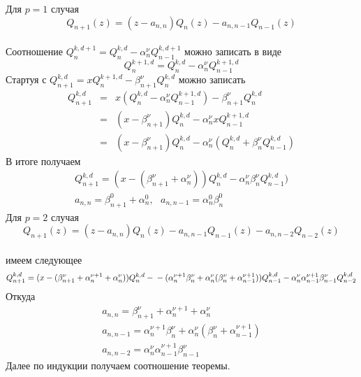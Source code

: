 Для $p=1$ случая $$Q_{n+1}(z)=(z-a_{n,n})Q_n(z)-a_{n,n-1}Q_{n-1}(z)$$\\
Соотношение $Q_n^{k,d+1}=Q_n^{k,d}-\alpha_n^{\nu} Q_{n-1}^{k,d+1}$
можно записать в виде $$ Q_n^{k+1,d}=Q_n^{k,d}-\alpha_n^{\nu}
Q_{n-1}^{k+1,d}$$ Стартуя с  $Q_{n+1}^{k,d} =
xQ_n^{k+1,d}-\beta_{n+1}^{{\nu}} Q_n^{k,d}$ можно записать
\begin{eqnarray*}
Q_{n+1}^{k,d} & = & x(Q_n^{k,d}-\alpha_n^{\nu}
Q_{n-1}^{k+1,d})-\beta_{n+1}^{{\nu}}
Q_n^{k,d} \nonumber \\
& = & (x-\beta_{n+1}^{{\nu}})Q_n^{k,d}-\alpha_n^{\nu}
xQ_{n-1}^{k+1,d} \nonumber \\
& = & (x-\beta_{n+1}^{{\nu}})Q_n^{k,d}-\alpha_n^{\nu}
(Q_n^{k,d}+\beta_n^{\nu}Q_{n-1}^{k,d})
\end{eqnarray*}
В итоге получаем
\begin{eqnarray*}
Q_{n+1}^{k,d}= (x-(\beta_{n+1}^{{\nu}}+\alpha_n^{\nu}))Q_n^{k,d}-
\alpha_n^{\nu}\beta_n^{\nu}Q_{n-1}^{k,d}) \\
a_{n,n} =\beta_{n+1}^{0}+\alpha_n^{0}, \mbox{    } a_{n,n-1} =
\alpha_n^{0}\beta_n^{0}
\end{eqnarray*}
Для $p=2$ случая $$Q_{n+1}(z)=(z-a_{n,n})Q_n(z)-a_{n,n-1}Q_{n-1}(z)-a_{n,n-2}Q_{n-2}(z)$$\\
имеем следующее
\begin{equation}
Q_{n+1}^{k,d} =
(x-(\beta_{n+1}^{{\nu}}+\alpha_n^{\nu+1}+\alpha_n^{\nu}))Q_n^{k,d}-\nonumber \\
-(\alpha_n^{\nu+1}\beta_{n}^{{\nu}}+\alpha_n^{\nu}(\beta_{n}^{{\nu}}+\alpha_{n-1}^{\nu+1}))Q_{n-1}^{k,d}-
\alpha_n^{\nu}\alpha_{n-1}^{\nu+1}\beta_{n-1}^{{\nu}}
Q_{n-2}^{k,d} \nonumber
\end{equation}
Откуда
\begin{eqnarray*}
 a_{n,n}
=\beta_{n+1}^{{\nu}}+\alpha_n^{\nu+1}+\alpha_n^{\nu} \nonumber
\\ a_{n,n-1} =
\alpha_n^{\nu+1}\beta_{n}^{{\nu}}+\alpha_n^{\nu}(\beta_{n}^{{\nu}}+\alpha_{n-1}^{\nu+1})
\nonumber \\ a_{n,n-2} =
\alpha_n^{\nu}\alpha_{n-1}^{\nu+1}\beta_{n-1}^{{\nu}}
\end{eqnarray*}
Далее по индукции получаем соотношение теоремы. \\
